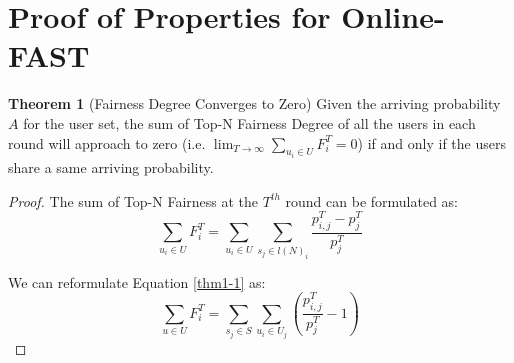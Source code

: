 \section{Proof of Properties for Online-FAST}

\textbf{Theorem 1} (Fairness Degree Converges to Zero) Given the arriving probability $A$ for the user set, the sum of Top-N Fairness Degree of all the users in each round will approach to zero (i.e.  $\lim_{T \rightarrow \infty}\sum_{u_{i} \in U} F_{i}^{T}=0$) if and only if the users share a same arriving probability.
\begin{proof}

The sum of Top-N Fairness at the $T^{th}$ round can be formulated as:
\begin{equation}
    \sum_{u_{i} \in U} F_{i}^{T}=\sum_{u_{i} \in U} \sum_{s_{j} \in l(N)_{i}} \frac{p_{i, j}^{T}-p_{j}^{T}}{p_{j}^{T}}
    \label{thm1-1}
\end{equation}

We can reformulate Equation \ref{thm1-1} as:
\begin{equation}
    \sum_{u \in U} F_{i}^{T}=\sum_{s_{j} \in S} \sum_{u_{i} \in U_{j}}\left( \frac{p_{i, j}^{T}}{p_{j}^{T}}-1\right)
    \label{thm1-2}
\end{equation}


\end{proof}
